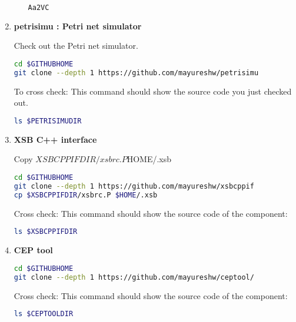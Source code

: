 \documentclass[12pt,a4paper]{article}
\begin{document}
\begin{enumerate}
\begin{enumerate}
\begin{lstlisting}[language=bash,style=snippet]
Aa2VC
\end{lstlisting}

\end{enumerate}

\item \textbf{petrisimu : Petri net simulator}

Check out the Petri net simulator.

\begin{lstlisting}[language=bash,style=snippet]
cd $GITHUBHOME
git clone --depth 1 https://github.com/mayureshw/petrisimu
\end{lstlisting}

To cross check: This command should show the source code you just checked out.

\begin{lstlisting}[language=bash,style=snippet]
ls $PETRISIMUDIR
\end{lstlisting}

\item \textbf{XSB C++ interface}

Copy $XSBCPPIFDIR/xsbrc.P $HOME/.xsb

\begin{lstlisting}[language=bash,style=snippet]
cd $GITHUBHOME
git clone --depth 1 https://github.com/mayureshw/xsbcppif
cp $XSBCPPIFDIR/xsbrc.P $HOME/.xsb
\end{lstlisting}

Cross check: This command should show the source code of the component:

\begin{lstlisting}[language=bash,style=snippet]
ls $XSBCPPIFDIR
\end{lstlisting}

\item \textbf{CEP tool}

\begin{lstlisting}[language=bash,style=snippet]
cd $GITHUBHOME
git clone --depth 1 https://github.com/mayureshw/ceptool/
\end{lstlisting}

Cross check: This command should show the source code of the component:

\begin{lstlisting}[language=bash,style=snippet]
ls $CEPTOOLDIR
\end{lstlisting}


\end{enumerate}
\end{document}
